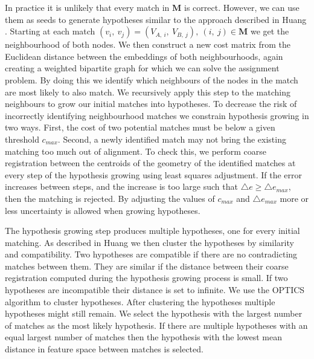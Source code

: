 In practice it is unlikely that every match in \(\mathbf{M}\) is correct. However, we can use them as seeds to generate hypotheses similar to the approach described in Huang \citep{huang_topological_2005}. Starting at each match \((v_i,\ v_j) = (V_{A,\ i},\ V_{B,\ j}),\ (i,\ j) \in \mathbf{M}\) we get the neighbourhood of both nodes. We then construct a new cost matrix from the Euclidean distance between the embeddings of both neighbourhoods, again creating a weighted bipartite graph for which we can solve the assignment problem. By doing this we identify which neighbours of the nodes in the match are most likely to also match. We recursively apply this step to the matching neighbours to grow our initial matches into hypotheses. To decrease the risk of incorrectly identifying neighbourhood matches we constrain hypothesis growing in two ways. First, the cost of two potential matches must be below a given threshold \(c_{max}\). Second, a newly identified match may not bring the existing matching too much out of alignment. To check this, we perform coarse registration between the centroids of the geometry of the identified matches at every step of the hypothesis growing using least squares adjustment. If the error increases between steps, and the increase is too large such that \(\triangle e \geq \triangle e_{max} \), then the matching is rejected. By adjusting the values of \(c_{max}\) and \(\triangle e_{max}\) more or less uncertainty is allowed when growing hypotheses.

The hypothesis growing step produces multiple hypotheses, one for every initial matching. As described in Huang \citep{huang_topological_2005} we then cluster the hypotheses by similarity and compatibility. Two hypotheses are compatible if there are no contradicting matches between them. They are similar if the distance between their coarse registration computed during the hypothesis growing process is small. If two hypotheses are incompatible their distance is set to infinite. We use the OPTICS algorithm to cluster hypotheses. After clustering the hypotheses multiple hypotheses might still remain. We select the hypothesis with the largest number of matches as the most likely hypothesis. If there are multiple hypotheses with an equal largest number of matches then the hypothesis with the lowest mean distance in feature space between matches is selected.

